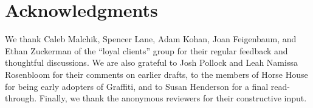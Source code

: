 \section{Acknowledgments}

We thank Caleb Malchik, Spencer Lane, Adam Kohan,
Joan Feigenbaum, and Ethan Zuckerman of the ``loyal clients'' group
for their regular feedback and thoughtful discussions.
We are also grateful to Josh Pollock and Leah Namissa Rosenbloom for their
comments on earlier drafts, to the members of Horse House
for being early adopters of Graffiti,
and to Susan Henderson for a final read-through.
Finally, we thank the anonymous reviewers for their constructive input.
